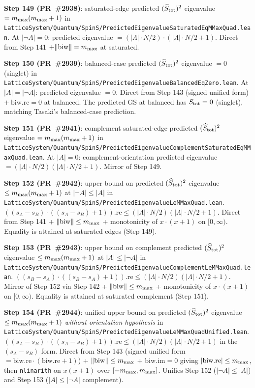 \documentclass[a4paper,11pt]{article}
\begin{document}
\textbf{Step 149 (PR~\#2938)}: saturated-edge predicted
$(\widehat S_{\rm tot})^2$ eigenvalue $= m_{\rm max}(m_{\rm max}+1)$ in
\texttt{LatticeSystem/Quantum/SpinS/PredictedEigenvalueSaturatedEqMMaxQuad.lean}.
At $|\neg A| = 0$: predicted eigenvalue $=
(|\Lambda|\cdot N/2)\cdot(|\Lambda|\cdot N/2 + 1)$. Direct from
Step 141 $+ \|\mathrm{biw}\| = m_{\rm max}$ at saturated.

\textbf{Step 150 (PR~\#2939)}: balanced-case predicted
$(\widehat S_{\rm tot})^2$ eigenvalue $= 0$ (singlet) in
\texttt{LatticeSystem/Quantum/SpinS/PredictedEigenvalueBalancedEqZero.lean}.
At $|A| = |\neg A|$: predicted eigenvalue $= 0$. Direct from
Step 143 (signed unified form) $+\ \mathrm{biw.re} = 0$ at balanced.
The predicted GS at balanced has $S_{\rm tot} = 0$ (singlet), matching
Tasaki's balanced-case prediction.

\textbf{Step 151 (PR~\#2941)}: complement saturated-edge predicted
$(\widehat S_{\rm tot})^2$ eigenvalue $= m_{\rm max}(m_{\rm max}+1)$ in
\texttt{LatticeSystem/Quantum/SpinS/PredictedEigenvalueComplementSaturatedEqMMaxQuad.lean}.
At $|A| = 0$: complement-orientation predicted eigenvalue $=
(|\Lambda|\cdot N/2)(|\Lambda|\cdot N/2 + 1)$. Mirror of Step 149.

\textbf{Step 152 (PR~\#2942)}: upper bound on predicted
$(\widehat S_{\rm tot})^2$ eigenvalue $\le m_{\rm max}(m_{\rm max}+1)$
at $|\neg A| \le |A|$ in
\texttt{LatticeSystem/Quantum/SpinS/PredictedEigenvalueLeMMaxQuad.lean}.
$((s_A-s_B)\cdot((s_A-s_B)+1)).\mathrm{re} \le
(|\Lambda|\cdot N/2)(|\Lambda|\cdot N/2 + 1)$.
Direct from Step 141 + $\|\mathrm{biw}\| \le m_{\rm max}$ +
monotonicity of $x\cdot(x+1)$ on $[0, \infty)$. Equality is attained
at saturated edges (Step 149).

\textbf{Step 153 (PR~\#2943)}: upper bound on complement predicted
$(\widehat S_{\rm tot})^2$ eigenvalue $\le m_{\rm max}(m_{\rm max}+1)$
at $|A| \le |\neg A|$ in
\texttt{LatticeSystem/Quantum/SpinS/PredictedEigenvalueComplementLeMMaxQuad.lean}.
$((s_B-s_A)\cdot((s_B-s_A)+1)).\mathrm{re} \le
(|\Lambda|\cdot N/2)(|\Lambda|\cdot N/2 + 1)$. Mirror of Step 152 via
Step 142 + $\|\mathrm{biw}\| \le m_{\rm max}$ + monotonicity of
$x\cdot(x+1)$ on $[0, \infty)$. Equality is attained at saturated
complement (Step 151).

\textbf{Step 154 (PR~\#2944)}: unified upper bound on predicted
$(\widehat S_{\rm tot})^2$ eigenvalue $\le m_{\rm max}(m_{\rm max}+1)$
\emph{without orientation hypothesis} in
\texttt{LatticeSystem/Quantum/SpinS/PredictedEigenvalueLeMMaxQuadUnified.lean}.
$((s_A-s_B)\cdot((s_A-s_B)+1)).\mathrm{re} \le
(|\Lambda|\cdot N/2)(|\Lambda|\cdot N/2 + 1)$ in the
$(s_A - s_B)$ form. Direct from Step 143 (signed unified form
$= \mathrm{biw.re}\cdot(\mathrm{biw.re}+1)$) +
$\|\mathrm{biw}\| \le m_{\rm max}$ + $\mathrm{biw.im} = 0$ giving
$|\mathrm{biw.re}| \le m_{\rm max}$, then \texttt{nlinarith} on
$x(x+1)$ over $[-m_{\rm max}, m_{\rm max}]$. Unifies Step 152
($|\neg A| \le |A|$) and Step 153 ($|A| \le |\neg A|$ complement).
\end{document}
